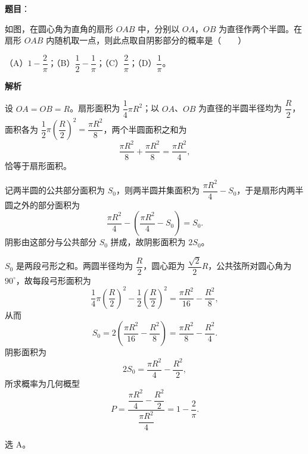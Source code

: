 \begin{answer}

\textbf{题目}：

如图，在圆心角为直角的扇形 $OAB$ 中，分别以 $OA$，$OB$ 为直径作两个半圆。在扇形 $OAB$ 内随机取一点，则此点取自阴影部分的概率是\mbox{（　　）}
\nopagebreak[4]
\begin{center}\end{center}
\nopagebreak[4]
（A）$1-\dfrac{2}{\pi}$；（B）$\dfrac12-\dfrac{1}{\pi}$；（C）$\dfrac{2}{\pi}$；（D）$\dfrac{1}{\pi}$。

\textbf{解析}

设 $OA=OB=R$。扇形面积为 $\dfrac14\pi R^2$；以 $OA$、$OB$ 为直径的半圆半径均为 $\dfrac R2$，面积各为 $\dfrac12\pi\left(\dfrac R2\right)^2=\dfrac{\pi R^2}{8}$，两个半圆面积之和为
\nopagebreak[4]
\[\frac{\pi R^2}{8}+\frac{\pi R^2}{8}=\frac{\pi R^2}{4},\]
恰等于扇形面积。

记两半圆的公共部分面积为 $S_0$，则两半圆并集面积为 $\dfrac{\pi R^2}{4}-S_0$，于是扇形内两半圆之外的部分面积为
\nopagebreak[4]
\[\frac{\pi R^2}{4}-\left(\frac{\pi R^2}{4}-S_0\right)=S_0.\]
阴影由这部分与公共部分 $S_0$ 拼成，故阴影面积为 $2S_0$。

$S_0$ 是两段弓形之和。两圆半径均为 $\dfrac R2$，圆心距为 $\dfrac{\sqrt2}{2}R$，公共弦所对圆心角为 $90^\circ$，故每段弓形面积为
\nopagebreak[4]
\[\frac14\pi\left(\frac R2\right)^2-\frac12\left(\frac R2\right)^2=\frac{\pi R^2}{16}-\frac{R^2}{8},\]
从而
\nopagebreak[4]
\[S_0=2\left(\frac{\pi R^2}{16}-\frac{R^2}{8}\right)=\frac{\pi R^2}{8}-\frac{R^2}{4}.\]
阴影面积为
\nopagebreak[4]
\[2S_0=\frac{\pi R^2}{4}-\frac{R^2}{2},\]
所求概率为几何概型
\nopagebreak[4]
\[P=\frac{\dfrac{\pi R^2}{4}-\dfrac{R^2}{2}}{\dfrac{\pi R^2}{4}}=1-\frac2\pi .\]

选 A。


\end{answer}
